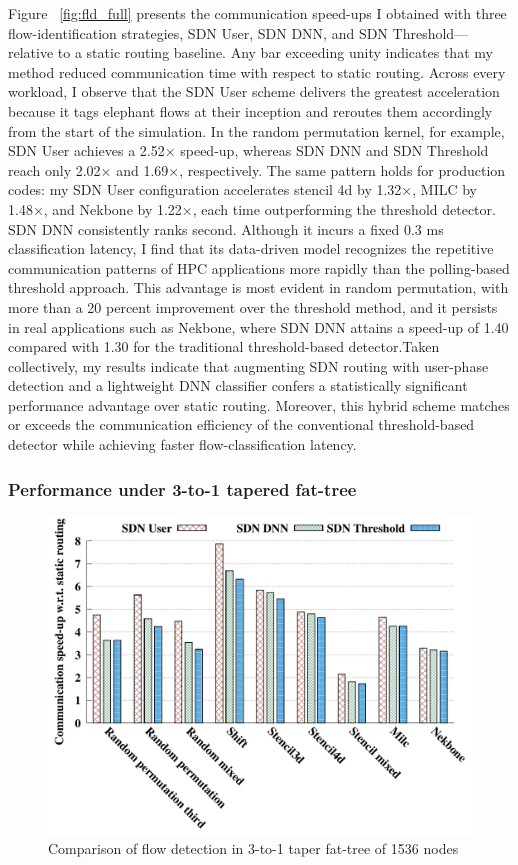 Figure ~\ref{fig:fld_full} presents the communication speed-ups I obtained with three flow-identification strategies, SDN User, SDN DNN, and SDN Threshold—relative to a static routing baseline. Any bar exceeding unity indicates that my method reduced communication time with respect to static routing. Across every workload, I observe that the SDN User scheme delivers the greatest acceleration because it tags elephant flows at their inception and reroutes them accordingly from the start of the simulation. In the random permutation kernel, for example, SDN User achieves a 2.52× speed-up, whereas SDN DNN and SDN Threshold reach only 2.02× and 1.69×, respectively. The same pattern holds for production codes: my SDN User configuration accelerates stencil 4d by 1.32×, MILC by 1.48×, and Nekbone by 1.22×, each time outperforming the threshold detector. SDN DNN consistently ranks second. Although it incurs a fixed 0.3 ms classification latency, I find that its data-driven model recognizes the repetitive communication patterns of HPC applications more rapidly than the polling-based threshold approach. This advantage is most evident in random permutation, with more than a 20 percent improvement over the threshold method, and it persists in real applications such as Nekbone, where SDN DNN attains a speed-up of 1.40 compared with 1.30 for the traditional threshold-based detector.Taken collectively, my results indicate that augmenting SDN routing with user-phase detection and a lightweight DNN classifier confers a statistically significant performance advantage over static routing. Moreover, this hybrid scheme matches or exceeds the communication efficiency of the conventional threshold-based detector while achieving faster flow-classification latency.

\subsubsection{Performance under 3-to-1 tapered fat-tree}
\begin{figure}[h]
  \centering
  \includegraphics[width=\columnwidth]{./figs_4/taper_fat_flow_detection.pdf}
  \caption{Comparison of flow detection in 3-to-1 taper fat-tree of 1536 nodes}
  \label{fig:fld_taper}
\end{figure}

